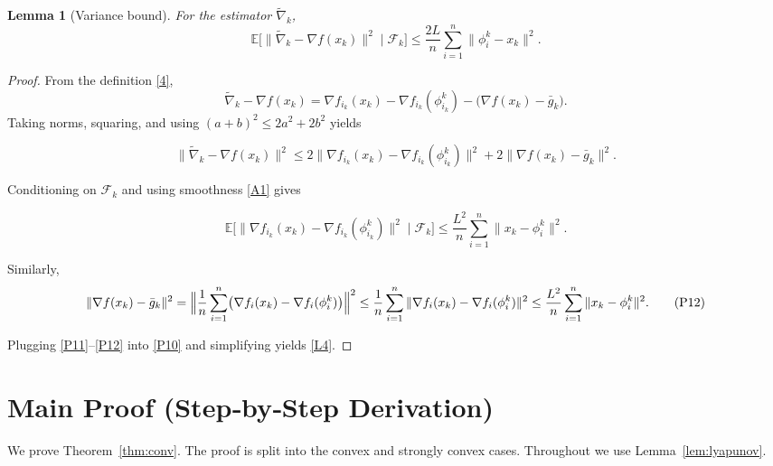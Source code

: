 \documentclass{article}
\newtheorem{lemma}{Lemma}
\newcommand{\E}{\mathbb{E}}
\newcommand{\grad}{\nabla}
\begin{document}
\begin{lemma}[Variance bound]\label{lem:varbound}
For the estimator $\tilde\nabla_k$,
\[
\E\!\bigl[\|\tilde\nabla_k-\grad f(x_k)\|^2\mid\mathcal{F}_k\bigr]
\le \frac{2L}{n}\sum_{i=1}^{n}\|\phi_i^k-x_k\|^2 .
\tag{L4}
\]
\end{lemma}
\begin{proof}
From the definition \eqref{4},
\[
\tilde\nabla_k-\grad f(x_k)=\grad f_{i_k}(x_k)-\grad f_{i_k}(\phi_{i_k}^k)-\bigl(\grad f(x_k)-\bar g_k\bigr).
\]
Taking norms, squaring, and using $(a+b)^2\le2a^2+2b^2$ yields  

\[
\|\tilde\nabla_k-\grad f(x_k)\|^2
\le 2\|\grad f_{i_k}(x_k)-\grad f_{i_k}(\phi_{i_k}^k)\|^2
+2\|\grad f(x_k)-\bar g_k\|^2 .
\tag{P10}
\]

Conditioning on $\mathcal{F}_k$ and using smoothness \eqref{A1} gives  

\[
\E\!\bigl[\|\grad f_{i_k}(x_k)-\grad f_{i_k}(\phi_{i_k}^k)\|^2\mid\mathcal{F}_k\bigr]
\le \frac{L^2}{n}\sum_{i=1}^{n}\|x_k-\phi_i^k\|^2 .
\tag{P11}
\]

Similarly,
\[
\|\grad f(x_k)-\bar g_k\|^2
= \Bigl\|\frac1n\sum_{i=1}^{n}\bigl(\grad f_i(x_k)-\grad f_i(\phi_i^k)\bigr)\Bigr\|^2
\le \frac{1}{n}\sum_{i=1}^{n}\|\grad f_i(x_k)-\grad f_i(\phi_i^k)\|^2
\le \frac{L^2}{n}\sum_{i=1}^{n}\|x_k-\phi_i^k\|^2 .
\tag{P12}
\]

Plugging \eqref{P11}–\eqref{P12} into \eqref{P10} and simplifying yields \eqref{L4}.
\qedhere
\end{proof}

\newpage
\section*{Main Proof (Step‑by‑Step Derivation)}
We prove Theorem~\ref{thm:conv}. The proof is split into the convex and strongly convex cases. Throughout we use Lemma~\ref{lem:lyapunov}.
\end{document}

